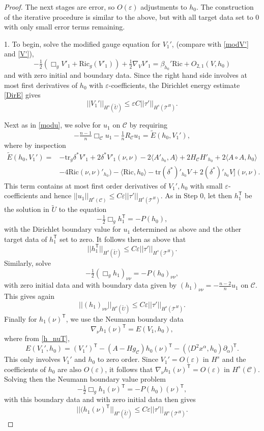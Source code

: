 \documentclass[10pt]{amsart}
\renewcommand{\a}{\alpha}
\renewcommand{\b}{\beta}
\renewcommand{\d}{\delta}
\newcommand{\e}{\varepsilon}
\newcommand{\cC}{{\mathcal C}}
\newcommand{\cT}{{\mathcal T}}
\newcommand{\Ric}{\mathrm{Ric}}
\newcommand{\tT}{\mathsf{T}}
\newcommand{\bes}{\begin{equation*}}
\newcommand{\ees}{\end{equation*}}
\newcommand{\tr}{\mathrm{tr}}
\newcommand{\p}{\partial}
\newcommand{\<}{\langle}
\renewcommand{\>}{\rangle}
\newcommand{\w}{\widetilde}
\theoremstyle{plain}
\theoremstyle{remark}
\theoremstyle{definition}
\numberwithin{equation}{section}
\begin{document}
\begin{proof}
  The next stages are error, so $O(\e)$ adjustments to $h_0$. The construction of the iterative procedure is similar to the above, but with all target data set to 
$0$ with only small error terms remaining. 

 1.  To begin, solve the modified gauge equation for $V_1'$, (compare with \eqref{modV'} and \eqref{V'}),  
$$-\tfrac{1}{2}(\Box_g V'_1+ \Ric_g (V'_1)) + \tfrac{1}{2}\nabla_{V} V'_1 = \b_{h_0}'\Ric + O_{2,1}(V, h_0)$$
and with zero initial and boundary data. Since the right hand side involves at most first derivatives of $h_0$ with $\e$-coefficients, the Dirichlet 
energy estimate \eqref{DirE} gives  
$$||V_1'||_{H^s(\w U)} \leq \e C||\tau'||_{H^s(\cT^H)}.$$

   Next as in \eqref{modu}, we solve for $u_1$ on $\cC$ by requiring 
$$-\tfrac{n-1}{n}\Box_\cC u_1 -\tfrac{1}{n}R_\cC u_1 = \w E(h_0, V_1'),$$
where by inspection 
\bes
\begin{split}
\w E(h_0, V_1') = & -\tr_g \d^*V'_1 + 2 \d^* V'_1(\nu, \nu) -2\<A'_{h_0}, A\> + 2 H_{\cC}H'_{h_0} + 2\<A\circ A, h_0\> \\ 
& - 4\Ric(\nu, \nu)'_{h_0}) - \<\Ric, h_0\>  - \tr (\d^*)'_{h_0}V + 2 (\d^*)'_{h_0}V](\nu,\nu).
\end{split}
\ees
This term contains at most first order derivatives of $V_1', h_0$ with small $\e$-coefficients and hence $||u_1||_{H^s(\cC)} \leq C\e ||\tau'||_{H^s(\cT^H)}$. 
As in Step 0, let then $h_1^{\tT}$ be the solution in $\w U$ to the equation 
$$-\tfrac{1}{2}\Box_g h_1^{\tT} = - P(h_0),$$
with the Dirichlet boundary value for $u_1$ determined as above and the other target data of $h_1^{\tT}$ set to zero. It follows then as above that 
$$||h_1^{\tT}||_{H^s(\w U)} \leq C\e ||\tau'||_{H^s(\cT^H)}.$$
Similarly, solve 
$$-\tfrac{1}{2}(\Box_g h_1)_{\nu \nu}  = -P(h_0)_{\nu \nu},$$
with zero initial data and with boundary data given by $(h_1)_{\nu \nu} = -\frac{n-2}{n}u_1$ on $\cC$. This gives again 
$$||(h_1)_{\nu \nu}||_{H^s(\w U)} \leq C\e ||\tau'||_{H^s(\cT^H)}.$$
Finally for $h_1(\nu)^{\tT}$, we use the Neumann boundary data 
$$\nabla_{\nu} h_1(\nu)^{\tT} = E(V_1, h_0),$$
where from \eqref{h_nuT}, 
$$E(V_1', h_0) = (V_1')^{\tT} - (A - Hg_{\cC})h_0(\nu)^{\tT} - (\<D^2x^{\a}, h_0)\p_{\a})^{\tT}.$$
This only involves $V_1'$ and $h_0$ to zero order. Since $V_1' = O(\e)$ in $H^s$ and the coefficients of $h_0$ are also $O(\e)$, it follows that 
$\nabla_{\nu} h_1(\nu)^{\tT} = O(\e)$ in $H^s(\cC)$. Solving then the Neumann boundary value problem 
$$-\tfrac{1}{2}\Box_g h_1(\nu)^{\tT} = - P(h_0)(\nu)^{\tT},$$
with this boundary data and with zero initial data then gives 
$$||(h_1(\nu)^{\tT}||_{H^s(\w U)} \leq C\e ||\tau'||_{H^s(\cT^H)}.$$
     

\end{proof}
\end{document}
